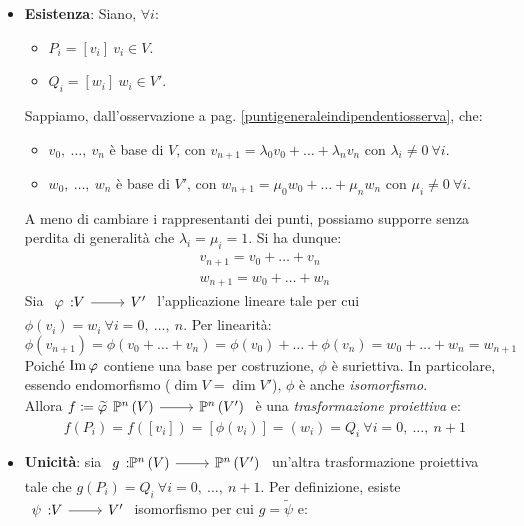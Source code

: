 \begin{demonstration}
	\begin{itemize}
		\item \textbf{Esistenza}: Siano, $\forall i$:
		\begin{itemize}
			\item $P_i=\left[v_i\right]\ v_i\in V$.
			\item $Q_i=\left[w_i\right]\ w_i\in V'$.
		\end{itemize}
	Sappiamo, dall'osservazione a pag. \ref{puntigeneraleindipendentiosserva}, che:
	\begin{itemize}
		\item $v_0,\ \ldots,\ v_n$ è base di $V$, con $v_{n+1}=\lambda_0v_0+\ldots+\lambda_n v_n$ con $\lambda_i\neq 0\ \forall i$.
		\item $w_0,\ \ldots,\ w_n$ è base di $V'$, con $w_{n+1}=\mu_0w_0+\ldots+\mu_n w_n$ con $\mu_i\neq 0\ \forall i$.
	\end{itemize}
		A meno di cambiare i rappresentanti dei punti, possiamo supporre senza perdita di generalità che $\lambda_i=\mu_i=1$. Si ha dunque:
		\begin{gather*}
			v_{n+1}=v_0+\ldots+v_n\\
			w_{n+1}=w_0+\ldots+w_n
		\end{gather*}
	Sia $\funz{\phi}{V}{V'}$ l'applicazione lineare tale per cui $\phi\left(v_i\right)=w_i\ \forall i=0,\ \ldots,\ n$. Per linearità:
	\begin{equation*}
		\phi\left(v_{n+1}\right)=\phi\left(v_0+\ldots+v_n\right)=\phi\left(v_0\right)+\ldots+\phi\left(v_n\right)=w_0+\ldots+w_n=w_{n+1}
	\end{equation*}
Poiché $\operatorname{Im} \varphi$ contiene una base per costruzione, $\phi$ è suriettiva. In particolare, essendo endomorfismo ($\dim V=\dim V'$), $\phi$ è anche \textit{isomorfismo}.\\
Allora $f\coloneqq\widetilde{\phi}\funz{\ }{\proj{V}}{\proj{V'}}$ è una \textit{trasformazione proiettiva} e:
\begin{equation*}
	f\left(P_i\right)=f\left(\left[v_i\right]\right)=\left[\phi\left(v_i\right)\right]=\left(w_i\right)=Q_i\ \forall i=0,\ \ldots,\ n+1
\end{equation*}
\item \textbf{Unicità}: sia $\funz{g}{\proj{V}}{\proj{V'}}$ un'altra trasformazione proiettiva tale che $g\left(P_i\right)=Q_i\ \forall i=0,\ \ldots,\ n+1$. Per definizione, esiste $\funz{\psi}{V}{V'}$ isomorfismo per cui $g=\widetilde{\psi}$ e:
\begin{equation*}

\end{equation*}
\end{itemize}
\end{demonstration}
